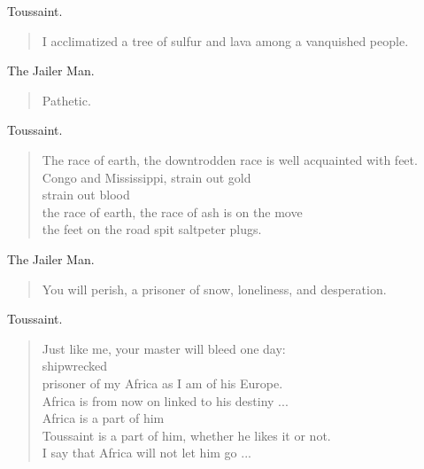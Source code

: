 \documentclass[letterpaper,article,12pt,oneside,notitlepage]{memoir}
\begin{document}
\begin{center}Toussaint.\end{center}

\begin{verse}
I acclimatized a tree of sulfur and lava among a vanquished people. \\
\end{verse}

\begin{center}The Jailer Man.\end{center}

\begin{verse}
Pathetic. \\
\end{verse}


\begin{center}Toussaint.\end{center}

\begin{verse}
The race of earth, the downtrodden race is well acquainted with feet. \\
Congo and Mississippi, strain out gold \\
strain out blood \\
the race of earth, the race of ash is on the move \\
the feet on the road spit saltpeter plugs. \\
\end{verse}

\begin{center}The Jailer Man.\end{center}

\begin{verse}
You will perish, a prisoner of snow, loneliness, and desperation. \\
\end{verse}

\begin{center}Toussaint.\end{center}

\begin{verse}
Just like me, your master will bleed one day: \\
shipwrecked \\
prisoner of my Africa as I am of his Europe. \\
Africa is from now on linked to his destiny ... \\
Africa is a part of him \\
Toussaint is a part of him, whether he likes it or not. \\
I say that Africa will not let him go ... \\
\end{verse}
\end{document}
